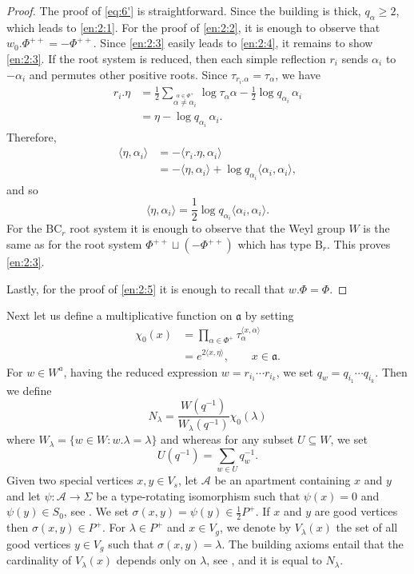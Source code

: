 \documentclass[11pt]{amsart}
\newcommand{\scrA}{\mathscr{A}}
\newcommand{\sprod}[2]{\langle {#1}, {#2} \rangle}
\theoremstyle{plain}
\theoremstyle{definition}
\numberwithin{equation}{section}
\begin{document}
\begin{proof}
	The proof of \eqref{eq:6'} is straightforward. Since the building is thick, $q_\alpha \geqslant 2$, which leads to 
	\eqref{en:2:1}. For the proof of \eqref{en:2:2}, it is enough to observe that $w_0. \Phi^{++} = -\Phi^{++}$. 
	Since \eqref{en:2:3} easily leads to \eqref{en:2:4}, it remains to show \eqref{en:2:3}.
	If the root system is reduced, then each simple reflection $r_i$ sends $\alpha_i$ to $-\alpha_i$ and permutes
	other positive roots. Since $\tau_{r_i.\alpha} = \tau_{\alpha}$, we have
	\begin{align*}
		r_i.\eta 
		&= \frac{1}{2} \sum_{\stackrel{\alpha \in \Phi^+}{\alpha \neq \alpha_i}} 
		\log \tau_{\alpha} \alpha - \frac{1}{2} \log q_{\alpha_i} \, \alpha_i \\
		&=
		\eta - \log q_{\alpha_i}\, \alpha_i.
	\end{align*}
	Therefore,
	\begin{align*}
		\sprod{\eta}{\alpha_i} 
		&= -\sprod{r_i. \eta}{\alpha_i} \\
		&= -\sprod{\eta}{\alpha_i} + \log q_{\alpha_i} \sprod{\alpha_i}{\alpha_i},
	\end{align*}
	and so
	\[
		\sprod{\eta}{\alpha_i} = \frac{1}{2} \log q_{\alpha_i} \sprod{\alpha_i}{\alpha_i}.
	\]
	For the $\text{BC}_r$ root system it is enough to observe that the Weyl group $W$ is the same as for the root
	system $\Phi^{++} \sqcup (-\Phi^{++})$ which has type $\text{B}_r$. This proves \eqref{en:2:3}.

	Lastly, for the proof of \eqref{en:2:5} it is enough to recall that $w.\Phi = \Phi$.
\end{proof}
Next let us define a multiplicative function on $\mathfrak{a}$ by setting 
\begin{equation}
	\label{eq:10}
	\begin{aligned}
	\chi_0(x)
	&= \prod_{\alpha \in \Phi^+} \tau_\alpha^{\sprod{x}{\alpha}}\\
	&= e^{2 \langle x, \eta \rangle}, \qquad x \in \mathfrak{a}. 
	\end{aligned}
\end{equation}
For $w \in W^a$, having the reduced expression $w = r_{i_1} \cdots r_{i_k}$, we set $q_{w} = q_{i_1} \cdots q_{i_k}$. Then
we define
\begin{equation}
	\label{eq:16}
	N_\lambda=\frac{W(q^{-1})}{W_\lambda(q^{-1})}\chi_0(\lambda)
\end{equation}
where $W_\lambda=\bigl\{w\in W:w .\lambda=\lambda\bigr\}$ and whereas for any subset $U\subseteq W$, we set 
\[
	U(q^{-1})=\sum_{w\in U}q_w^{-1}.
\]
Given two special vertices $x, y \in V_s$, let $\scrA$ be an apartment containing $x$ and $y$ and let $\psi:
\scrA \rightarrow \Sigma$ be a type-rotating isomorphism such that $\psi(x) = 0$ and $\psi(y) \in S_0$, see
\cite[Definition 4.1.1]{park}. We set $\sigma(x, y) = \psi(y) \in \frac12 P^+$. If $x$ and $y$ are good vertices then
$\sigma(x, y) \in P^+$. For $\lambda \in P^+$ and $x \in V_g$, we denote by $V_{\lambda}(x)$ the set of all good vertices
$y \in V_g$ such that $\sigma(x, y) = \lambda$. The building axioms entail that the cardinality of $V_\lambda(x)$ depends
only on $\lambda$, see \cite[Proposition 1.5]{park2}, and it is equal to $N_\lambda$.
\end{document}
